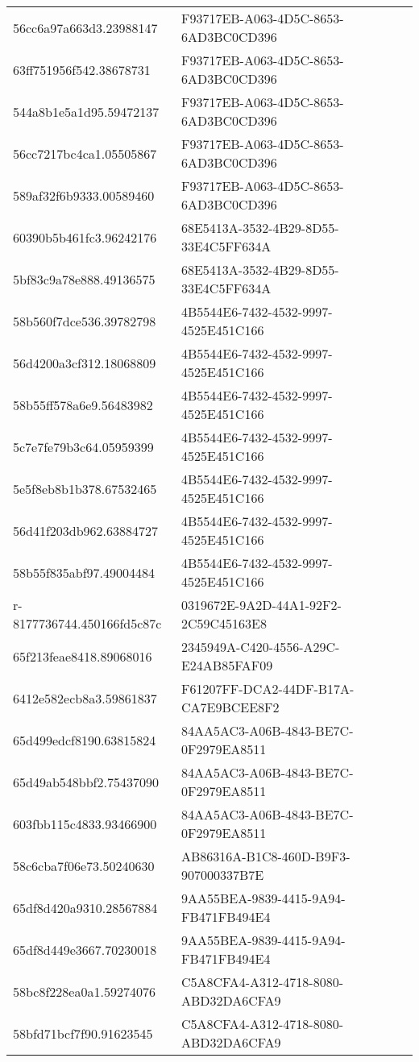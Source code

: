 \begin{tabular}{ll}
56cc6a97a663d3.23988147 & F93717EB-A063-4D5C-8653-6AD3BC0CD396 \\
63ff751956f542.38678731 & F93717EB-A063-4D5C-8653-6AD3BC0CD396 \\
544a8b1e5a1d95.59472137 & F93717EB-A063-4D5C-8653-6AD3BC0CD396 \\
56cc7217bc4ca1.05505867 & F93717EB-A063-4D5C-8653-6AD3BC0CD396 \\
589af32f6b9333.00589460 & F93717EB-A063-4D5C-8653-6AD3BC0CD396 \\
60390b5b461fc3.96242176 & 68E5413A-3532-4B29-8D55-33E4C5FF634A \\
5bf83c9a78e888.49136575 & 68E5413A-3532-4B29-8D55-33E4C5FF634A \\
58b560f7dce536.39782798 & 4B5544E6-7432-4532-9997-4525E451C166 \\
56d4200a3cf312.18068809 & 4B5544E6-7432-4532-9997-4525E451C166 \\
58b55ff578a6e9.56483982 & 4B5544E6-7432-4532-9997-4525E451C166 \\
5c7e7fe79b3c64.05959399 & 4B5544E6-7432-4532-9997-4525E451C166 \\
5e5f8eb8b1b378.67532465 & 4B5544E6-7432-4532-9997-4525E451C166 \\
56d41f203db962.63884727 & 4B5544E6-7432-4532-9997-4525E451C166 \\
58b55f835abf97.49004484 & 4B5544E6-7432-4532-9997-4525E451C166 \\
r-8177736744.450166fd5c87c & 0319672E-9A2D-44A1-92F2-2C59C45163E8 \\
65f213feae8418.89068016 & 2345949A-C420-4556-A29C-E24AB85FAF09 \\
6412e582ecb8a3.59861837 & F61207FF-DCA2-44DF-B17A-CA7E9BCEE8F2 \\
65d499edcf8190.63815824 & 84AA5AC3-A06B-4843-BE7C-0F2979EA8511 \\
65d49ab548bbf2.75437090 & 84AA5AC3-A06B-4843-BE7C-0F2979EA8511 \\
603fbb115c4833.93466900 & 84AA5AC3-A06B-4843-BE7C-0F2979EA8511 \\
58c6cba7f06e73.50240630 & AB86316A-B1C8-460D-B9F3-907000337B7E \\
65df8d420a9310.28567884 & 9AA55BEA-9839-4415-9A94-FB471FB494E4 \\
65df8d449e3667.70230018 & 9AA55BEA-9839-4415-9A94-FB471FB494E4 \\
58bc8f228ea0a1.59274076 & C5A8CFA4-A312-4718-8080-ABD32DA6CFA9 \\
58bfd71bcf7f90.91623545 & C5A8CFA4-A312-4718-8080-ABD32DA6CFA9 \\

\end{tabular}
